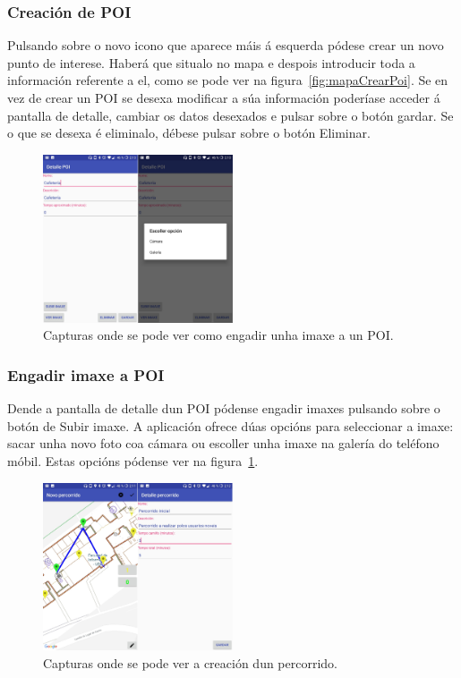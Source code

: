 \subsubsection{Creación de POI}
Pulsando sobre o novo icono que aparece máis á esquerda pódese crear un novo punto de interese. Haberá que situalo no mapa e despois introducir toda a información referente a el, como se pode ver na figura~\ref{fig:mapaCrearPoi}. Se en vez de crear un POI se desexa modificar a súa información poderíase acceder á pantalla de detalle, cambiar os datos desexados e pulsar sobre o botón gardar. Se o que se desexa é eliminalo, débese pulsar sobre o botón Eliminar.

\begin{figure}[h]
	\begin{center}
		\includegraphics[width=0.5\textwidth]{figures/android/mapaEngadirImaxe}
		\caption{Capturas onde se pode ver como engadir unha imaxe a un POI.}
		\label{fig:mapaEngadirImaxe}
	\end{center}
\end{figure}

\subsubsection{Engadir imaxe a POI}
Dende a pantalla de detalle dun POI pódense engadir imaxes pulsando sobre o botón de Subir imaxe. A aplicación ofrece dúas opcións para seleccionar a imaxe: sacar unha novo foto coa cámara ou escoller unha imaxe na galería do teléfono móbil. Estas opcións pódense ver na figura~\ref{fig:mapaEngadirImaxe}.

\begin{figure}[h]
	\begin{center}
		\includegraphics[width=0.5\textwidth]{figures/android/mapaCrearPercorrido}
		\caption{Capturas onde se pode ver a creación dun percorrido.}
		\label{fig:mapaCrearPercorrido}
	\end{center}
\end{figure}

